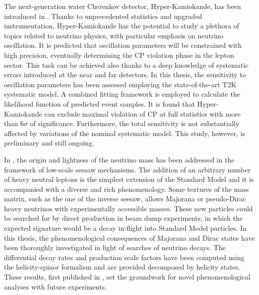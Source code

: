 The next-generation water Cherenkov detector, Hyper-Kamiokande, has been introduced in .
Thanks to unprecedented statistics and upgraded instrumentation, Hyper-Kamiokande has the potential %
to study a plethora of topics related to neutrino physics, with particular emphasis on neutrino oscillation.
It is predicted that oscillation parameters will be constrained with high precision, %
eventually determining the CP violation phase in the lepton sector.
This task can be achieved also thanks to a deep knowledge of systematic errors %
introduced at the near and far detectors.
In this thesis, the sensitivity to oscillation parameters has been assessed employing %
the state-of-the-art T2K systematic model.
A combined fitting framework is employed to calculate the likelihood function of predicted event samples.
It is found that Hyper-Kamiokande can exclude maximal violation of CP at full statistics %
with more than $6\sigma$ of significance.
Furthermore, the total sensitivity is not substantially affected by variations of the nominal systematic model.
This study, however, is preliminary and still ongoing.

In , the origin and lightness of the neutrino mass has been addressed %
in the framework of low-scale seesaw mechanisms.
The addition of an arbitrary number of heavy neutral leptons is the simplest extension of the Standard Model %
and it is accompanied with a diverse and rich phenomenology.
Some textures of the mass matrix, such as the one of the inverse seesaw, %
allows Majorana or pseudo-Dirac heavy neutrinos with experimentally accessible masses.
These new particles could be searched for by direct production in beam dump experiments, %
in which the expected signature would be a decay in-flight into Standard Model particles.
In this thesis, the phenomenological consequences of Majorana and Dirac states have been thoroughly investigated %
in light of searches of neutrino decays.
The differential decay rates and production scale factors have been computed using %
the helicity-spinor formalism and are provided decomposed by helicity states.
These results, first published in , set the groundwork for novel phenomenological analyses %
with future experiments.

